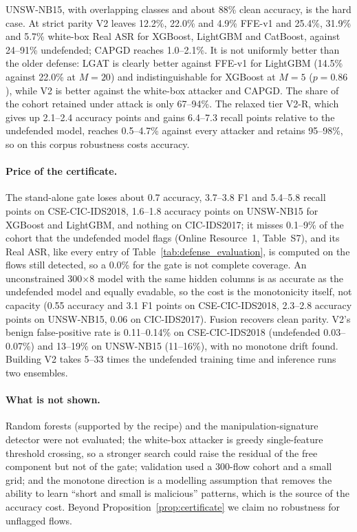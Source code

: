 UNSW-NB15, with overlapping classes and about 88\% clean accuracy, is the hard case. At strict parity V2 leaves 12.2\%, 22.0\% and 4.9\% FFE-v1 and 25.4\%, 31.9\% and 5.7\% white-box Real ASR for XGBoost, LightGBM and CatBoost, against 24--91\% undefended; CAPGD reaches 1.0--2.1\%. It is not uniformly better than the older defense: LGAT is clearly better against FFE-v1 for LightGBM (14.5\% against 22.0\% at $M=20$) and indistinguishable for XGBoost at $M=5$ ($p=0.86$), while V2 is better against the white-box attacker and CAPGD. The share of the cohort retained under attack is only 67--94\%. The relaxed tier V2-R, which gives up 2.1--2.4 accuracy points and gains 6.4--7.3 recall points relative to the undefended model, reaches 0.5--4.7\% against every attacker and retains 95--98\%, so on this corpus robustness costs accuracy.

\paragraph{Price of the certificate.} The stand-alone gate loses about 0.7 accuracy, 3.7--3.8 F1 and 5.4--5.8 recall points on CSE-CIC-IDS2018, 1.6--1.8 accuracy points on UNSW-NB15 for XGBoost and LightGBM, and nothing on CIC-IDS2017; it misses 0.1--9\% of the cohort that the undefended model flags (Online Resource~1, Table~S7), and its Real ASR, like every entry of Table~\ref{tab:defense_evaluation}, is computed on the flows still detected, so a 0.0\% for the gate is not complete coverage. An unconstrained 300$\times$8 model with the same hidden columns is as accurate as the undefended model and equally evadable, so the cost is the monotonicity itself, not capacity (0.55 accuracy and 3.1 F1 points on CSE-CIC-IDS2018, 2.3--2.8 accuracy points on UNSW-NB15, 0.06 on CIC-IDS2017). Fusion recovers clean parity. V2's benign false-positive rate is 0.11--0.14\% on CSE-CIC-IDS2018 (undefended 0.03--0.07\%) and 13--19\% on UNSW-NB15 (11--16\%), with no monotone drift found. Building V2 takes 5--33 times the undefended training time and inference runs two ensembles.

  \paragraph{What is not shown.} Random forests (supported by the recipe) and the manipulation-signature detector were not evaluated; the white-box attacker is greedy single-feature threshold crossing, so a stronger search could raise the residual of the free component but not of the gate; validation used a 300-flow cohort and a small grid; and the monotone direction is a modelling assumption that removes the ability to learn ``short and small is malicious'' patterns, which is the source of the accuracy cost. Beyond Proposition~\ref{prop:certificate} we claim no robustness for unflagged flows.
